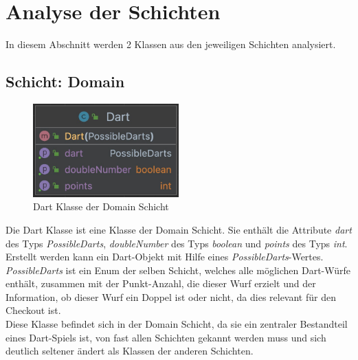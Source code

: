 \section{Analyse der Schichten}
In diesem Abschnitt werden 2 Klassen aus den jeweiligen Schichten analysiert.
\subsection{Schicht: Domain}
\begin{figure}[ht]
    \includegraphics[width=0.5\textwidth]{Bilder/Dart.png}
    \caption{Dart Klasse der Domain Schicht}
    \label{fig:dart-uml}
\end{figure}
Die Dart Klasse ist eine Klasse der Domain Schicht. Sie enthält die Attribute \textit{dart} des Typs \textit{PossibleDarts}, \textit{doubleNumber} des Typs \textit{boolean} und \textit{points} des Typs \textit{int}. Erstellt werden kann ein Dart-Objekt mit Hilfe eines \textit{PossibleDarts}-Wertes. \textit{PossibleDarts} ist ein Enum der selben Schicht, welches alle möglichen Dart-Würfe enthält, zusammen mit der Punkt-Anzahl, die dieser Wurf erzielt und der Information, ob dieser Wurf ein Doppel ist oder nicht, da dies relevant für den Checkout ist.\\
Diese Klasse befindet sich in der Domain Schicht, da sie ein zentraler Bestandteil eines Dart-Spiels ist, von fast allen Schichten gekannt werden muss und sich deutlich seltener ändert als Klassen der anderen Schichten.
